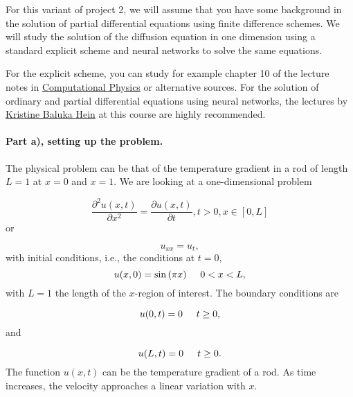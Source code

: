 \documentclass[%
oneside,                 %
final,                   %
10pt]{article}
\begin{document}
For this variant of project 2, we will assume that you have some background in the solution of partial differential equations using finite difference schemes. We will study the solution of the diffusion equation in one dimension using a standard explicit scheme and neural networks to solve the same equations. 

For the explicit scheme, you can study for example chapter 10 of the lecture notes in \href{{https://github.com/CompPhysics/ComputationalPhysics/blob/master/doc/Lectures/lectures2015.pdf}}{Computational Physics} or alternative sources. For the solution of ordinary and partial differential equations using neural networks, the lectures by \href{{https://compphysics.github.io/MachineLearning/doc/pub/odenn/html/odenn-bs.html}}{Kristine Baluka Hein} at this course are highly recommended.


\paragraph{Part a), setting up the problem.}
The physical problem can be that of the temperature gradient in a rod of length $L=1$ at $x=0$ and $x=1$.
We are looking at a one-dimensional
problem

\begin{equation*}
 \frac{\partial^2 u(x,t)}{\partial x^2} =\frac{\partial u(x,t)}{\partial t}, t> 0, x\in [0,L]
\end{equation*}
or

\begin{equation*}
u_{xx} = u_t,
\end{equation*}
with initial conditions, i.e., the conditions at $t=0$,
\begin{equation*}
u(x,0)= \sin{(\pi x)} \hspace{0.5cm} 0 < x < L,
\end{equation*}
with $L=1$ the length of the $x$-region of interest. The 
boundary conditions are

\begin{equation*}
u(0,t)= 0 \hspace{0.5cm} t \ge 0,
\end{equation*}
and

\begin{equation*}
u(L,t)= 0 \hspace{0.5cm} t \ge 0.
\end{equation*}
The function $u(x,t)$  can be the temperature gradient of a  rod.
As time increases, the velocity approaches a linear variation with $x$. 
\end{document}
